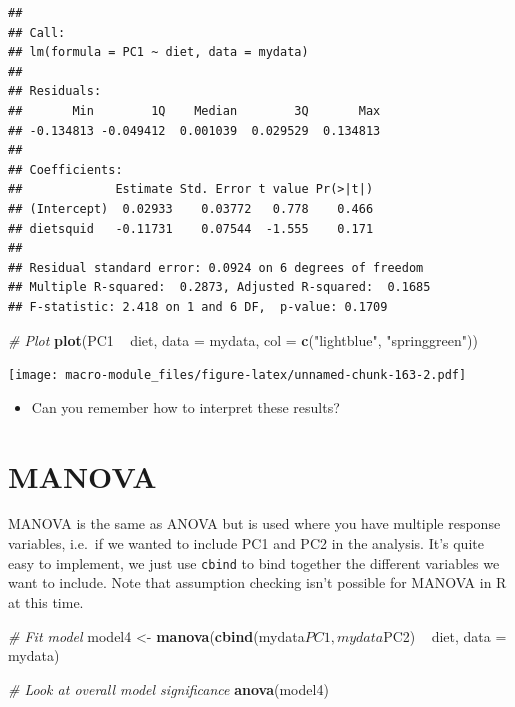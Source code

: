 \documentclass[]{book}
\newenvironment{Shaded}{\begin{snugshade}}{\end{snugshade}}
\newcommand{\KeywordTok}[1]{\textcolor[rgb]{0.13,0.29,0.53}{\textbf{{#1}}}}
\newcommand{\DataTypeTok}[1]{\textcolor[rgb]{0.13,0.29,0.53}{{#1}}}
\newcommand{\StringTok}[1]{\textcolor[rgb]{0.31,0.60,0.02}{{#1}}}
\newcommand{\CommentTok}[1]{\textcolor[rgb]{0.56,0.35,0.01}{\textit{{#1}}}}
\newcommand{\NormalTok}[1]{{#1}}
\providecommand{\tightlist}{%
  \setlength{\itemsep}{0pt}\setlength{\parskip}{0pt}}
\begin{document}
\begin{verbatim}
## 
## Call:
## lm(formula = PC1 ~ diet, data = mydata)
## 
## Residuals:
##       Min        1Q    Median        3Q       Max 
## -0.134813 -0.049412  0.001039  0.029529  0.134813 
## 
## Coefficients:
##             Estimate Std. Error t value Pr(>|t|)
## (Intercept)  0.02933    0.03772   0.778    0.466
## dietsquid   -0.11731    0.07544  -1.555    0.171
## 
## Residual standard error: 0.0924 on 6 degrees of freedom
## Multiple R-squared:  0.2873, Adjusted R-squared:  0.1685 
## F-statistic: 2.418 on 1 and 6 DF,  p-value: 0.1709
\end{verbatim}

\begin{Shaded}
\begin{Highlighting}[]
\CommentTok{# Plot}
\KeywordTok{plot}\NormalTok{(PC1 ~}\StringTok{ }\NormalTok{diet, }\DataTypeTok{data =} \NormalTok{mydata, }\DataTypeTok{col =} \KeywordTok{c}\NormalTok{(}\StringTok{"lightblue"}\NormalTok{, }\StringTok{"springgreen"}\NormalTok{))}
\end{Highlighting}
\end{Shaded}

\texttt{[image: macro-module\_files/figure-latex/unnamed-chunk-163-2.pdf]}

\begin{itemize}
\tightlist
\item
  Can you remember how to interpret these results?
\end{itemize}

\section{MANOVA}\label{manova}

MANOVA is the same as ANOVA but is used where you have multiple response
variables, i.e.~if we wanted to include PC1 and PC2 in the analysis.
It's quite easy to implement, we just use \texttt{cbind} to bind
together the different variables we want to include. Note that
assumption checking isn't possible for MANOVA in R at this time.

\begin{Shaded}
\begin{Highlighting}[]
\CommentTok{# Fit model}
\NormalTok{model4 <-}\StringTok{ }\KeywordTok{manova}\NormalTok{(}\KeywordTok{cbind}\NormalTok{(mydata$PC1,mydata$PC2) ~}\StringTok{ }\NormalTok{diet, }\DataTypeTok{data =} \NormalTok{mydata)}

\CommentTok{# Look at overall model significance}
\KeywordTok{anova}\NormalTok{(model4)}
\end{Highlighting}
\end{Shaded}
\end{document}

